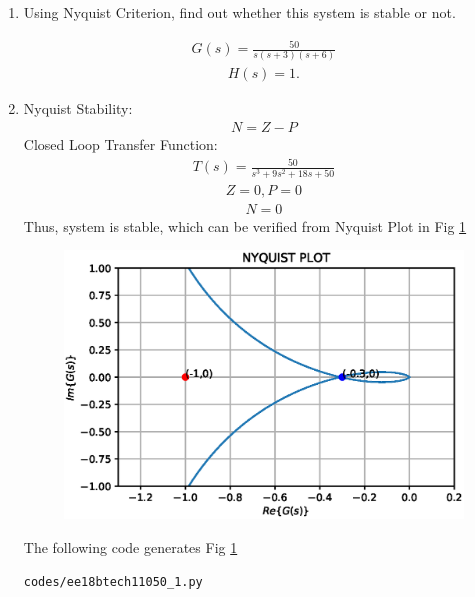 \begin{enumerate}[label=\thesection.\arabic*.,ref=\thesection.\theenumi]
\item Using Nyquist Criterion, find out whether this system is stable or not.

\begin{align}
    G(s) = \frac{50}{s(s+3)(s+6)}
    \label{eq:ee18btech11050_1}
\end{align}
\begin{align}
    H(s) = 1.
    \label{eq:ee18btech11050_2}
\end{align}

\item \solution

Nyquist Stability:
\begin{align}
    N = Z -P
\end{align}
Closed Loop Transfer Function:
\begin{align}
    T(s) = \frac{50}{s^3+9s^2+18s+50}
\end{align}
\begin{align}
    Z = 0, P = 0
\end{align}
\begin{align}
    N = 0
\end{align}
Thus, system is stable, which can be verified from Nyquist Plot in Fig \ref{fig:ee18btech11050_fig1}

\begin{figure}[!ht]
\centering
\includegraphics[width=\columnwidth]{./figs/ee18btech11050_1.eps}
\caption{}
\label{fig:ee18btech11050_fig1}
\end{figure}

The following code generates Fig \ref{fig:ee18btech11050_fig1}
\begin{lstlisting}
codes/ee18btech11050_1.py
\end{lstlisting}

\end{enumerate}
